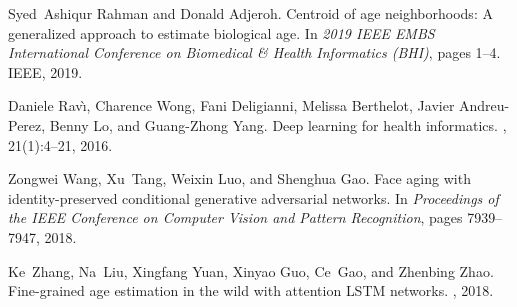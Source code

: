 \documentclass[unnumsec,webpdf,contemporary,large]{oup-authoring-template}%
\theoremstyle{thmstyleone}%
\theoremstyle{thmstyletwo}%
\theoremstyle{thmstylethree}%
\begin{document}
\begin{thebibliography}{10}
Syed~Ashiqur Rahman and Donald Adjeroh.
\newblock Centroid of age neighborhoods: A generalized approach to estimate
  biological age.
\newblock In {\em 2019 IEEE EMBS International Conference on Biomedical \&
  Health Informatics (BHI)}, pages 1--4. IEEE, 2019.

Daniele Rav{\`\i}, Charence Wong, Fani Deligianni, Melissa Berthelot, Javier
  Andreu-Perez, Benny Lo, and Guang-Zhong Yang.
\newblock Deep learning for health informatics.
,
  21(1):4--21, 2016.

Zongwei Wang, Xu~Tang, Weixin Luo, and Shenghua Gao.
\newblock Face aging with identity-preserved conditional generative adversarial
  networks.
\newblock In {\em Proceedings of the IEEE Conference on Computer Vision and
  Pattern Recognition}, pages 7939--7947, 2018.

Ke~Zhang, Na~Liu, Xingfang Yuan, Xinyao Guo, Ce~Gao, and Zhenbing Zhao.
\newblock Fine-grained age estimation in the wild with attention {LSTM}
  networks.
, 2018.

\end{thebibliography}


% 
% 
\end{document}
